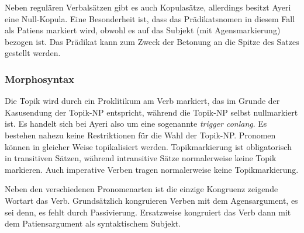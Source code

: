 \documentclass[
	12pt,
	ngerman,
]{scrartcl}
\newcommand{\fw}[1]{\textit{#1}} %
\newcommand{\zwsp}{\mbox{​}} %
\newcommand{\rayr}[2]{\zwsp\smash{{\Tagati #1}} \emph{#2}} %
\begin{document}
Neben regulären Verbalsätzen gibt es auch Kopulasätze, allerdings besitzt Ayeri
eine Null-Kopula. Eine Besonderheit ist, dass das Prädikatsnomen in diesem Fall
als Patiens markiert wird, obwohl es auf das Subjekt (mit Agensmarkierung)
bezogen ist. Das Prädikat kann zum Zweck der Betonung an die Spitze des Satzes
gestellt werden.



\subsubsection{Morphosyntax}
\label{subsubsec:morphsyn}

Die Topik wird durch ein Proklitikum am Verb markiert, das im Grunde der
Kasusendung der Topik-NP entspricht, während die Topik-NP
selbst nullmarkiert ist. Es handelt sich bei Ayeri also um eine sogenannte
\fw{trigger conlang}. Es bestehen nahezu keine Restriktionen für die Wahl der
Topik-NP. Pronomen können in gleicher Weise topikalisiert werden.
Topikmarkierung ist obligatorisch in transitiven Sätzen, während intransitive
Sätze normalerweise keine Topik markieren. Auch imperative Verben tragen
normalerweise keine Topikmarkierung.


Neben den verschiedenen Pronomenarten ist die einzige Kongruenz zeigende
Wortart das Verb. Grundsätzlich kongruieren Verben mit dem Agensargument, es
sei denn, es fehlt durch
Passivierung. Ersatzweise kongruiert das Verb dann mit dem Patiensargument als
syntaktischem Subjekt.
\end{document}
